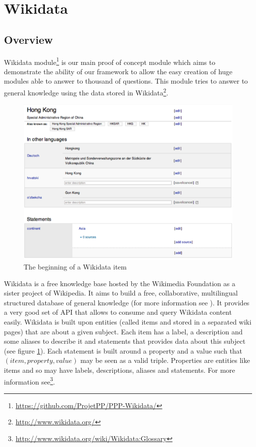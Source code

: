 \section{Wikidata}

\subsection{Overview}
Wikidata module\footnote{\url{https://github.com/ProjetPP/PPP-Wikidata/}} is our main proof of concept module which aims to demonstrate the ability of our framework to allow the easy creation of huge modules able to answer to thousand of questions. This module tries to answer to general knowledge using the data stored in Wikidata\footnote{\url{http://www.wikidata.org/}}.

\begin{figure}[!h]
  \centering
    \label{wikidata:item-screenshot}
    \includegraphics[width=\textwidth]{./wikidata-item-screenshot.png}
    \caption{The beginning of a Wikidata item}
\end{figure}

Wikidata is a free knowledge base hosted by the Wikimedia Foundation as a sister project of Wikipedia. It aims to build a free, collaborative, multilingual structured database of general knowledge (for more information see \cite{42240}). It provides a very good set of API that allows to consume and query Wikidata content easily. Wikidata is built upon entities (called items and stored in a separated wiki pages) that are about a given subject. Each item has a label, a description and some aliases to describe it and statements that provides data about this subject (see figure \ref{wikidata:item-screenshot}). Each statement is built around a property and a value such that $(item, property, value)$ may be seen as a valid triple. Properties are entities like items and so may have labels, descriptions, aliases and statements. For more information see\footnote{\url{http://www.wikidata.org/wiki/Wikidata:Glossary}}.

